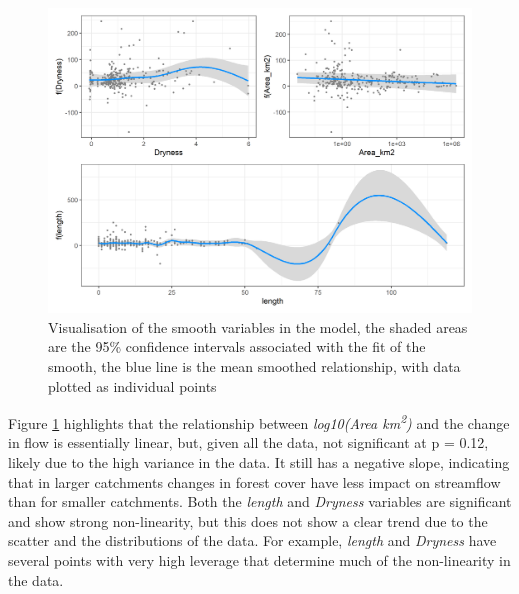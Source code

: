 \documentclass[]{elsarticle} %
\begin{document}
\begin{figure}
\includegraphics[width=0.9\linewidth]{model6_smooths} \caption{Visualisation of the smooth variables in the model, the shaded areas are the 95\% confidence intervals associated with the fit of the smooth, the blue line is the mean smoothed relationship, with data plotted as individual points}\label{fig:smoothsmodel6}
\end{figure}

\newpage

Figure \ref{fig:smoothsmodel6} highlights that the relationship between \emph{log10(Area km\textsuperscript{2})} and the change in flow is essentially linear, but, given all the data, not significant at p = 0.12, likely due to the high variance in the data. It still has a negative slope, indicating that in larger catchments changes in forest cover have less impact on streamflow than for smaller catchments. Both the \emph{length} and \emph{Dryness} variables are significant and show strong non-linearity, but this does not show a clear trend due to the scatter and the distributions of the data. For example, \emph{length} and \emph{Dryness} have several points with very high leverage that determine much of the non-linearity in the data.
\end{document}

